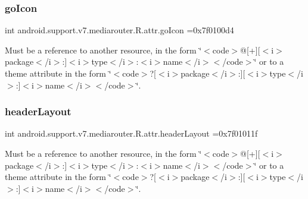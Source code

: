 \subsubsection{\texorpdfstring{go\+Icon}{goIcon}}
{\footnotesize\ttfamily int android.\+support.\+v7.\+mediarouter.\+R.\+attr.\+go\+Icon =0x7f0100d4\hspace{0.3cm}{\ttfamily [static]}}

Must be a reference to another resource, in the form \char`\"{}$<$code$>$@\mbox{[}+\mbox{]}\mbox{[}$<$i$>$package$<$/i$>$\+:\mbox{]}$<$i$>$type$<$/i$>$\+:$<$i$>$name$<$/i$>$$<$/code$>$\char`\"{} or to a theme attribute in the form \char`\"{}$<$code$>$?\mbox{[}$<$i$>$package$<$/i$>$\+:\mbox{]}\mbox{[}$<$i$>$type$<$/i$>$\+:\mbox{]}$<$i$>$name$<$/i$>$$<$/code$>$\char`\"{}. \mbox{\label{classandroid_1_1support_1_1v7_1_1mediarouter_1_1R_1_1attr_a4be7297f22c11f2c656c89cc78eca215}} 
\subsubsection{\texorpdfstring{header\+Layout}{headerLayout}}
{\footnotesize\ttfamily int android.\+support.\+v7.\+mediarouter.\+R.\+attr.\+header\+Layout =0x7f01011f\hspace{0.3cm}{\ttfamily [static]}}

Must be a reference to another resource, in the form \char`\"{}$<$code$>$@\mbox{[}+\mbox{]}\mbox{[}$<$i$>$package$<$/i$>$\+:\mbox{]}$<$i$>$type$<$/i$>$\+:$<$i$>$name$<$/i$>$$<$/code$>$\char`\"{} or to a theme attribute in the form \char`\"{}$<$code$>$?\mbox{[}$<$i$>$package$<$/i$>$\+:\mbox{]}\mbox{[}$<$i$>$type$<$/i$>$\+:\mbox{]}$<$i$>$name$<$/i$>$$<$/code$>$\char`\"{}. \mbox{\label{classandroid_1_1support_1_1v7_1_1mediarouter_1_1R_1_1attr_ac2d0839f9c7aaf7042df6d5beda43613}} 
